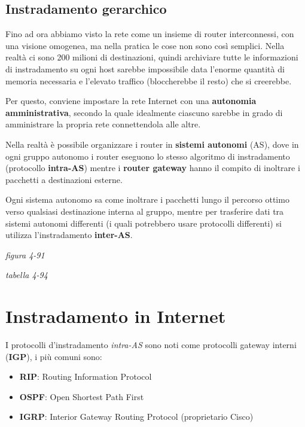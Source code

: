 \documentclass[
]{article}
\begin{document}
\hypertarget{header-n228}{%
\subsection{Instradamento gerarchico}\label{header-n228}}

Fino ad ora abbiamo visto la rete come un insieme di router
interconnessi, con una visione omogenea, ma nella pratica le cose non
sono così semplici. Nella realtà ci sono 200 milioni di destinazioni,
quindi archiviare tutte le informazioni di instradamento su ogni host
sarebbe impossibile data l'enorme quantità di memoria necessaria e
l'elevato traffico (bloccherebbe il resto) che si creerebbe.

Per questo, conviene impostare la rete Internet con una
\textbf{autonomia amministrativa}, secondo la quale idealmente ciascuno
sarebbe in grado di amministrare la propria rete connettendola alle
altre.

Nella realtà è possibile organizzare i router in \textbf{sistemi
autonomi} (AS), dove in ogni gruppo autonomo i router eseguono lo stesso
algoritmo di instradamento (protocollo \textbf{intra-AS}) mentre i
\textbf{router gateway} hanno il compito di inoltrare i pacchetti a
destinazioni esterne.

Ogni sistema autonomo sa come inoltrare i pacchetti lungo il percorso
ottimo verso qualsiasi destinazione interna al gruppo, mentre per
trasferire dati tra sistemi autonomi differenti (i quali potrebbero
usare protocolli differenti) si utilizza l'instradamento
\textbf{inter-AS}.

\emph{figura 4-91}

\emph{tabella 4-94}

\hypertarget{header-n235}{%
\section{Instradamento in Internet}\label{header-n235}}

I protocolli d'instradamento \emph{intra-AS} sono noti come protocolli
gateway interni (\textbf{IGP}), i più comuni sono:

\begin{itemize}
\item
  \textbf{RIP}: Routing Information Protocol
\item
  \textbf{OSPF}: Open Shortest Path First
\item
  \textbf{IGRP}: Interior Gateway Routing Protocol (proprietario Cisco)
\end{itemize}
\end{document}
